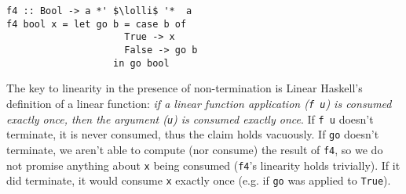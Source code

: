 \documentclass[acmsmall,review,anonymous]{acmart}
\newcommand{\incode}[1]{\lstinline{#1}}
\newcommand{\lolli}{\multimap}
\begin{document}
\begin{notyet}
\begin{lstlisting}
f4 :: Bool -> a *' $\lolli$ '*  a
f4 bool x = let go b = case b of
                     True -> x
                     False -> go b
                   in go bool
          \end{lstlisting}
        \end{notyet}

The key to linearity in the presence of non-termination is Linear Haskell's
definition of a linear function: \emph{if a linear function application (\incode{f u}) is
consumed exactly once, then the argument (\incode{u}) is consumed exactly once}.
If \incode{f u} doesn't terminate, it is never consumed, thus the claim holds
vacuously.
%
If \incode{go} doesn't terminate, we aren't able to compute (nor consume) the result
of \incode{f4}, so we do not promise anything about \incode{x} being consumed (\incode{f4}'s
linearity holds trivially). If it did terminate, it would consume \incode{x} exactly
once (e.g. if \incode{go} was applied to \incode{True}).
\end{document}
